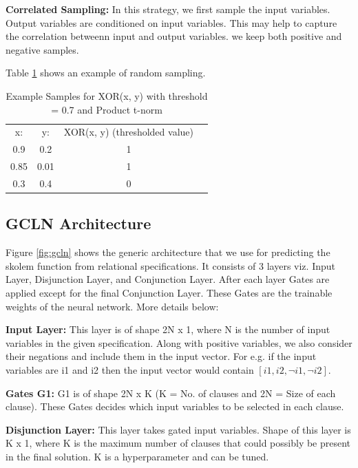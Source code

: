 \noindent\textbf{Correlated Sampling: }\label{sample3} 
In this strategy, we first sample the input variables. Output variables are conditioned on input variables. 
This may help to capture the correlation betweenn input and output variables. we keep both positive and 
negative samples.

Table \ref{tab:tnorms} shows an example of random sampling.

\begin{table}[t]
\centering
\begin{tabular}{cccc}
	x: & y: & XOR(x, y) (thresholded value)\\ 
	0.9 & 0.2 & 1\\  
	0.85 & 0.01 & 1\\
    0.3 & 0.4 & 0
\end{tabular}
\caption{Example Samples for XOR(x, y) with threshold = 0.7 and Product t-norm}
\label{tab:tnorms}
\end{table}


\subsection{GCLN Architecture}\label{gcln}
Figure \ref{fig:gcln} shows the generic architecture that we use for predicting the skolem function from relational specifications.
It consists of 3 layers viz. Input Layer, Disjunction Layer, and Conjunction Layer. After each layer Gates are applied except for the final Conjunction Layer.
These Gates are the trainable weights of the neural network. More details below:

\smallskip
\noindent\textbf{Input Layer:} This layer is of shape 2N x 1, where N is the number of input variables in the given specification. 
Along with positive variables, we also consider their negations and include them in the input vector. For e.g. if the input variables 
are i1 and i2 then the input vector would contain $[i1, i2, \neg{i1}, \neg{i2}]$.

\smallskip
\noindent\textbf{Gates G1:} G1 is of shape 2N x K (K = No. of clauses and 2N = Size of each clause).
These Gates decides which input variables to be selected in each clause.

\smallskip
\noindent\textbf{Disjunction Layer:} This layer takes gated input variables. Shape of this layer is K x 1, where K is the maximum 
number of clauses that could possibly be present in the final solution. K is a hyperparameter and can be tuned.

